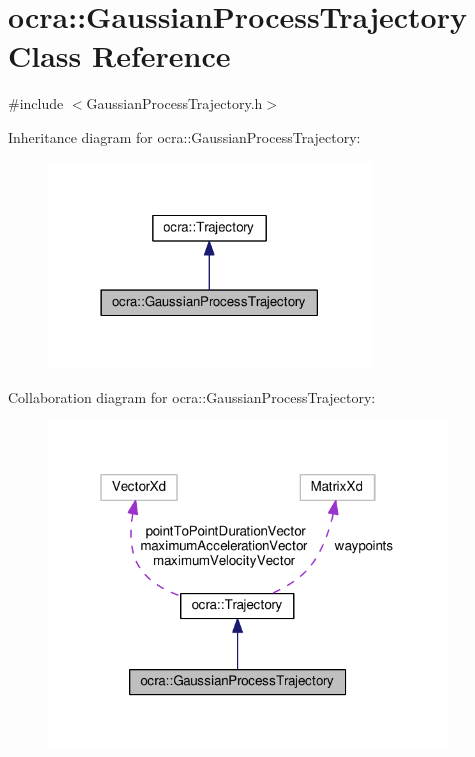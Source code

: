\hypertarget{classocra_1_1GaussianProcessTrajectory}{}\section{ocra\+:\+:Gaussian\+Process\+Trajectory Class Reference}
\label{classocra_1_1GaussianProcessTrajectory}


{\ttfamily \#include $<$Gaussian\+Process\+Trajectory.\+h$>$}



Inheritance diagram for ocra\+:\+:Gaussian\+Process\+Trajectory\+:
\nopagebreak
\begin{figure}[H]
\begin{center}
\leavevmode
\includegraphics[width=242pt]{dc/d69/classocra_1_1GaussianProcessTrajectory__inherit__graph}
\end{center}
\end{figure}


Collaboration diagram for ocra\+:\+:Gaussian\+Process\+Trajectory\+:
\nopagebreak
\begin{figure}[H]
\begin{center}
\leavevmode
\includegraphics[width=301pt]{d1/d1f/classocra_1_1GaussianProcessTrajectory__coll__graph}
\end{center}
\end{figure}
